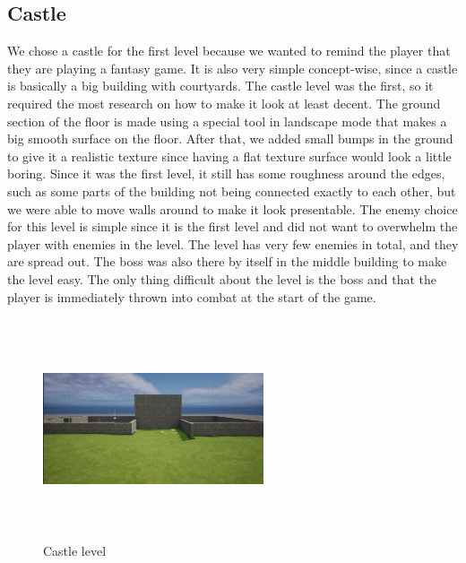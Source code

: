 \documentclass{sigchi}
\begin{document}
\subsection{Castle}
We chose a castle for the first level because we wanted to remind the player that they are playing a fantasy game. It is also very simple concept-wise, since a castle is basically a big building with courtyards. The castle level was the first, so it required the most research on how to make it look at least decent. The ground section of the floor is made using a special tool in landscape mode that makes a big smooth surface on the floor. After that, we added small bumps in the ground to give it a realistic texture since having a flat texture surface would look a little boring. Since it was the first level, it still has some roughness around the edges, such as some parts of the building not being connected exactly to each other, but we were able to move walls around to make it look presentable. The enemy choice for this level is simple since it is the first level and did not want to overwhelm the player with enemies in the level. The level has very few enemies in total, and they are spread out. The boss was also there by itself in the middle building to make the level easy. The only thing difficult about the level is the boss and that the player is immediately thrown into combat at the start of the game. 
\begin{figure}


\includegraphics[width=6.5cm, height=6.5cm]{Figure/castle.png}
\caption{Castle level}
\end{figure}
\end{document}
